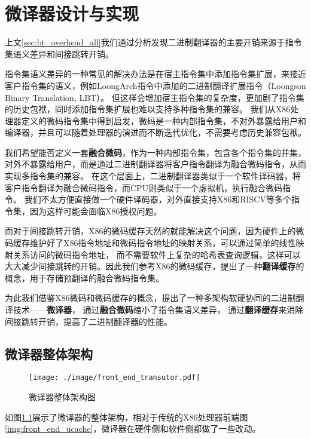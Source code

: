 \chapter{微译器设计与实现}\label{chap:MUT}

上文\ref{sec:bt_overhead_all}我们通过分析发现二进制翻译器的主要开销来源于指令集语义差异和间接跳转开销。

指令集语义差异的一种常见的解决办法是在宿主指令集中添加指令集扩展，来接近客户指令集的语义，例如LoongArch指令中添加的二进制翻译扩展指令（Loongson Binary Translation, LBT）\cite{LoongArch2023}。
但这样会增加宿主指令集的复杂度，更加剧了指令集的历史包袱，同时添加指令集扩展也难以支持多种指令集的兼容。
我们从X86处理器定义的微码指令集中得到启发，微码是一种内部指令集，不对外暴露给用户和编译器，并且可以随着处理器的演进而不断迭代优化，不需要考虑历史兼容包袱。

我们希望能否定义一套\textbf{融合微码}，作为一种内部指令集，包含各个指令集的并集，对外不暴露给用户，而是通过二进制翻译器将客户指令翻译为融合微码指令，从而实现多指令集的兼容。
在这个层面上，二进制翻译器类似于一个软件译码器，将客户指令翻译为融合微码指令，而CPU则类似于一个虚拟机，执行融合微码指令。
我们不太方便直接做一个硬件译码器，对外直接支持X86和RISCV等多个指令集，因为这样可能会面临X86授权问题。

而对于间接跳转开销，X86的微码缓存天然的就能解决这个问题，因为硬件上的微码缓存维护好了X86指令地址和微码指令地址的映射关系，可以通过简单的线性映射关系访问的微码指令地址，
而不需要软件上复杂的哈希表查询逻辑，这样可以大大减少间接跳转的开销。因此我们参考X86的微码缓存，提出了一种\textbf{翻译缓存}的概念，用于存储预翻译的融合微码指令集。

为此我们借鉴X86微码和微码缓存的概念，提出了一种多架构软硬协同的二进制翻译技术——\textbf{微译器}，
通过\textbf{融合微码}缩小了指令集语义差异，
通过\textbf{翻译缓存}来消除间接跳转开销，提高了二进制翻译器的性能。

\section{微译器整体架构}

\begin{figure}[!htbp]
  \centering
  \texttt{[image: ./image/front\_end\_transutor.pdf]}
  \caption{微译器整体架构图}
  \label{img:front_end_transutor}
\end{figure}

如图\ref{img:front_end_transutor}展示了微译器的整体架构，相对于传统的X86处理器前端图\ref{img:front_end_ucache}，微译器在硬件侧和软件侧都做了一些改动。

